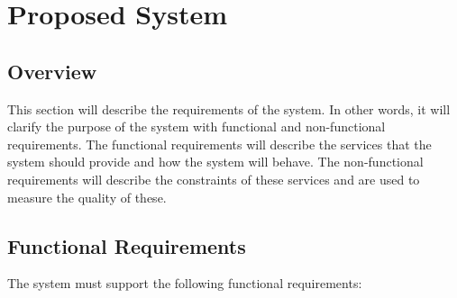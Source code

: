 \section{Proposed System}

\subsection{Overview}

This section will describe the requirements of the system. In other words, it will clarify the purpose of the system with functional and non-functional requirements. The functional requirements will describe the services that the system should provide and how the system will behave. The non-functional requirements will describe the constraints of these services and are used to measure the quality of these. 

\subsection{Functional Requirements}
The system must support the following functional requirements:

